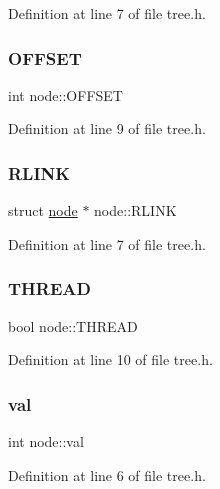 Definition at line 7 of file tree.\+h.

\mbox{\label{structnode_ad7798e0c58f39de43614d2eb281ea3b3}} 
\subsubsection{\texorpdfstring{O\+F\+F\+S\+ET}{OFFSET}}
{\footnotesize\ttfamily int node\+::\+O\+F\+F\+S\+ET}



Definition at line 9 of file tree.\+h.

\mbox{\label{structnode_a4a40cde3bcc46a6b5ce467dbd21efb98}} 
\subsubsection{\texorpdfstring{R\+L\+I\+NK}{RLINK}}
{\footnotesize\ttfamily struct \mbox{\hyperlink{structnode}{node}} $\ast$ node\+::\+R\+L\+I\+NK}



Definition at line 7 of file tree.\+h.

\mbox{\label{structnode_ac104f38eb93c8f1f49977b3441d5692c}} 
\subsubsection{\texorpdfstring{T\+H\+R\+E\+AD}{THREAD}}
{\footnotesize\ttfamily bool node\+::\+T\+H\+R\+E\+AD}



Definition at line 10 of file tree.\+h.

\mbox{\label{structnode_a707bf3f1eeeaf8974e7e8e90f7bfd6a1}} 
\subsubsection{\texorpdfstring{val}{val}}
{\footnotesize\ttfamily int node\+::val}



Definition at line 6 of file tree.\+h.


